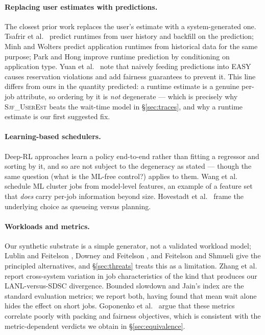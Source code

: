 \documentclass[11pt,twocolumn]{article}
\begin{document}
\paragraph{Replacing user estimates with predictions.}
The closest prior work replaces the user's estimate with a system-generated one.
Tsafrir et al.\ \cite{Tsafrir2007} predict runtimes from user history and
backfill on the prediction; Minh and Wolters \cite{Minh2010} predict application
runtimes from historical data for the same purpose; Park and Hong
\cite{Park2025} improve runtime prediction by conditioning on application type.
Yuan et al.\ \cite{Yuan2014} note that naively feeding predictions into EASY
causes reservation violations and add fairness guarantees to prevent it. This
line differs from ours in the quantity predicted: a runtime estimate is a
genuine per-job attribute, so ordering by it is \emph{not} degenerate --- which
is precisely why \textsc{Sjf\_UserEst} beats the wait-time model in
\S\ref{sec:traces}, and why a runtime estimate is our first suggested fix.

\paragraph{Learning-based schedulers.}
Deep-RL approaches \cite{ML-Scheduling1, ML-Scheduling2} learn a policy
end-to-end rather than fitting a regressor and sorting by it, and so are not
subject to the degeneracy as stated --- though the same question (what is the
ML-free control?) applies to them. Wang et al.\ \cite{Wang2023} schedule ML
cluster jobs from model-level features, an example of a feature set that
\emph{does} carry per-job information beyond size. Hovestadt et al.\
\cite{Hovestadt2003} frame the underlying choice as queueing versus planning.

\paragraph{Workloads and metrics.}
Our synthetic substrate is a simple generator, not a validated workload model;
Lublin and Feitelson \cite{Lublin2003}, Downey and Feitelson \cite{Downey1999},
and Feitelson and Shmueli \cite{Feitelson2009} give the principled alternatives,
and \S\ref{sec:threats} treats this as a limitation. Zhang et al.\
\cite{Zhang2024} report cross-system variation in job characteristics of the
kind that produces our LANL-versus-SDSC divergence. Bounded slowdown
\cite{Feitelson2000} and Jain's index \cite{Jain1984} are the standard
evaluation metrics; we report both, having found that mean wait alone hides the
effect on short jobs. Goponenko et al.\ \cite{Goponenko2022} argue that these
metrics correlate poorly with packing and fairness objectives, which is
consistent with the metric-dependent verdicts we obtain in
\S\ref{sec:equivalence}.
\end{document}
